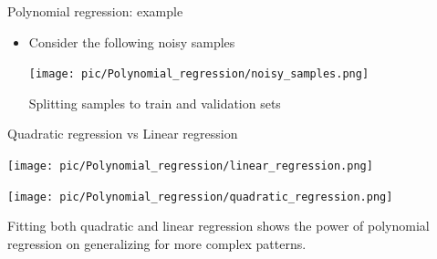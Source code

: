 \documentclass[serif, aspectratio=169]{beamer}
\begin{document}
    \begin{frame}{Polynomial regression: example}
        \begin{itemize}
            \item Consider the following noisy samples
            \begin{center}
                \texttt{[image: pic/Polynomial\_regression/noisy\_samples.png]}
            \end{center}
            \vfile
            \begin{center}
                Splitting samples to train and validation sets
            \end{center}
        \end{itemize}
    \end{frame}

    \begin{frame}{Quadratic regression vs Linear regression}
        \begin{minipage}{0.48\textwidth}
            \centering
            \texttt{[image: pic/Polynomial\_regression/linear\_regression.png]}
        \end{minipage} %
        \begin{minipage}{0.48\textwidth}
            \centering
            \texttt{[image: pic/Polynomial\_regression/quadratic\_regression.png]}
        \end{minipage}
        \vfile
        \begin{center}
            Fitting both quadratic and linear regression shows the power of polynomial regression on generalizing for more complex patterns.
        \end{center}
    \end{frame}


\end{document}

